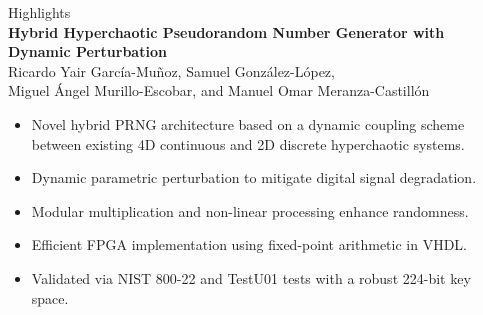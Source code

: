 \documentclass[12pt]{article}
\begin{document}
\begin{center}
    \begin{minipage}{0.9\linewidth}
        {\large Highlights} \\[0.6em]
        
        {\normalsize \textbf{Hybrid Hyperchaotic Pseudorandom Number Generator with Dynamic Perturbation}} \\[-1em]
        
        {\normalsize Ricardo Yair García-Muñoz, Samuel González-López,\\ 
        Miguel Ángel Murillo-Escobar, and Manuel Omar Meranza-Castillón} \\[-1em]
        
        \begin{itemize}[leftmargin=2.5em, itemsep=0.6em, label=\textbullet]
            \item Novel hybrid PRNG architecture based on a dynamic coupling scheme between existing 4D continuous and 2D discrete hyperchaotic systems.
            \item Dynamic parametric perturbation to mitigate digital signal degradation.
            \item Modular multiplication and non-linear processing enhance randomness.
            \item Efficient FPGA implementation using fixed-point arithmetic in VHDL.
            \item Validated via NIST 800-22 and TestU01 tests with a robust 224-bit key space.
        \end{itemize}
    \end{minipage}
\end{center}
\end{document}

